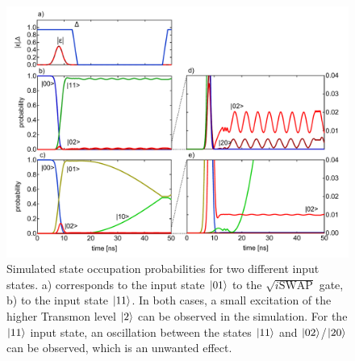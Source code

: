 \begin{figure}[ht!]
	\centering
	\includegraphics[width=\textwidth]{./data/simulation/three_level_swap/plots}
	\caption{Simulated state occupation probabilities for two different input states. a) corresponds to the input state $\left| 01 \right>$ to the $\sqrt{i\mathrm{SWAP}}$ gate, b) to the input state $\left| 11 \right>$. In both cases, a small excitation of the higher Transmon level $\left| 2 \right>$ can be observed in the simulation. For the $\left| 11 \right>$ input state, an oscillation between the states $\left| 11 \right>$ and $\left| 02 \right>$/$\left| 20 \right>$ can be observed, which is an unwanted effect.}
	\label{fig:swap_3_level_data}
\end{figure}

